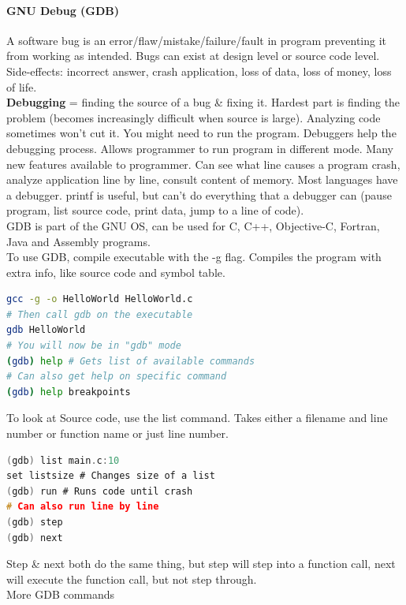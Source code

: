 \documentclass[12 pt]{article}
\begin{document}
\paragraph{GNU Debug (GDB)}
A software bug is an error/flaw/mistake/failure/fault in program preventing it from working as intended. Bugs can exist at design level or source code level. Side-effects: incorrect answer, crash application, loss of data, loss of money, loss of life.
\\ \textbf{Debugging} = finding the source of a bug \& fixing it. Hardest part is finding the problem (becomes increasingly difficult when source is large). Analyzing code sometimes won't cut it. You might need to run the program. Debuggers help the debugging process. Allows programmer to run program in different mode. Many new features available to programmer. Can see what line causes a program crash, analyze application line by line, consult content of memory. Most languages have a debugger. printf is useful, but can't do everything that a debugger can (pause program, list source code, print data, jump to a line of code).
\\ GDB is part of the GNU OS, can be used for C, C++, Objective-C, Fortran, Java and Assembly programs.
\\ To use GDB, compile executable with the -g flag. Compiles the program with extra info, like source code and symbol table. 
\begin{lstlisting}[language=bash]
gcc -g -o HelloWorld HelloWorld.c
# Then call gdb on the executable
gdb HelloWorld
# You will now be in "gdb" mode
(gdb) help # Gets list of available commands
# Can also get help on specific command
(gdb) help breakpoints
\end{lstlisting}
To look at Source code, use the list command. Takes either a filename and line number or function name or just line number.
\begin{lstlisting}[language=c]
(gdb) list main.c:10
set listsize # Changes size of a list
(gdb) run # Runs code until crash
# Can also run line by line
(gdb) step
(gdb) next 
\end{lstlisting}
Step \& next both do the same thing, but step will step into a function call, next will execute the function call, but not step through.
\\ More GDB commands
\end{document}

